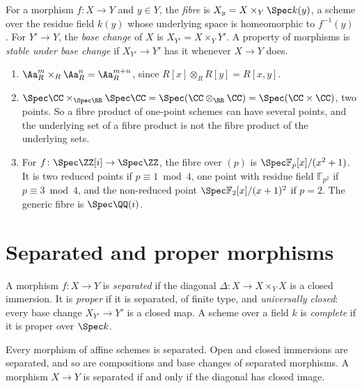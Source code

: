 \begin{definition}\label{schemes:definition-fibre}
For a morphism $f \colon X \to Y$ and $y \in Y$, the \emph{fibre} is $X_y = X \times_Y\Spec k(y)$, a scheme over the residue field $k(y)$ whose underlying space
is homeomorphic to $f^{-1}(y)$ \cite[Exercise II.3.10]{hartshorne-ag}. For $Y' \to Y$, the \emph{base change} of $X$ is $X_{Y'} = X \times_YY'$. A property of
morphisms is \emph{stable under base change} if $X_{Y'} \to Y'$ has it whenever $X \to Y$ does.
\end{definition}

\begin{example}\label{schemes:example-fibre-products}
\begin{enumerate}
\item $\Aa^m_R \times_R \Aa^n_R = \Aa^{m+n}_R$, since $R[x] \otimes_RR[y] = R[x, y]$.
\item $\Spec\CC \times_{\Spec\RR}\Spec\CC = \Spec(\CC \otimes_\RR\CC) = \Spec(\CC \times \CC)$, two points. So a fibre product of one-point schemes can have
several points, and the underlying set of a fibre product is not the fibre product of the underlying sets.
\item For $f \colon \Spec\ZZ[i] \to \Spec\ZZ$, the fibre over $(p)$ is $\Spec\mathbb{F}_p[x]/(x^2 + 1)$. It is two reduced points if $p \equiv 1 \bmod 4$, one
point with residue field $\mathbb{F}_{p^2}$ if $p \equiv 3 \bmod 4$, and the non-reduced point $\Spec\mathbb{F}_2[x]/(x + 1)^2$ if $p = 2$. The
generic fibre is $\Spec\QQ(i)$.
\end{enumerate}
\end{example}

\section{Separated and proper morphisms}\label{schemes:section-separated-proper}

\begin{definition}\label{schemes:definition-separated}
A morphism $f \colon X \to Y$ is \emph{separated} if the diagonal $\Delta \colon X \to X \times_YX$ is a closed immersion. It is \emph{proper} if it is
separated, of finite type, and \emph{universally closed}: every base change $X_{Y'} \to Y'$ is a closed map. A scheme over a field $k$ is \emph{complete} if
it is proper over $\Spec k$.
\end{definition}

\begin{proposition}\label{schemes:proposition-affine-separated}
Every morphism of affine schemes is separated. Open and closed immersions are separated, and so are compositions and base changes of separated
morphisms. A morphism $X \to Y$ is separated if and only if the diagonal has closed image.
\end{proposition}


